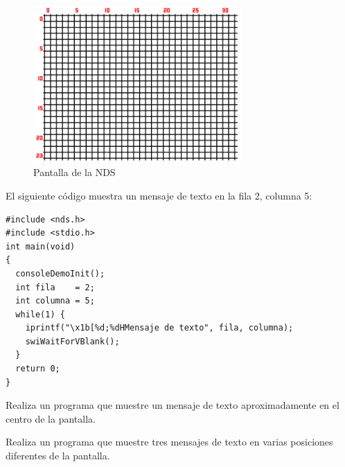 \begin{figure}[t]
\centering
\includegraphics[height=6cm]{Figuras/C3/c3_eclipse12.png}
\caption{Pantalla de la NDS}
\label{fig_c3_texto}
\end{figure}

\begin{example}
El siguiente código muestra un mensaje de texto en la fila 2, columna 5:
\begin{lstlisting}
#include <nds.h>
#include <stdio.h>
int main(void)
{
  consoleDemoInit(); 
  int fila    = 2;
  int columna = 5;
  while(1) {
  	iprintf("\x1b[%d;%dHMensaje de texto", fila, columna);
  	swiWaitForVBlank();  
  }
  return 0;
}
\end{lstlisting}
\end{example}

\begin{exercise}
Realiza un programa que muestre un mensaje de texto aproximadamente en el centro de la pantalla. 
\end{exercise}

\begin{exercise}
Realiza un programa que muestre tres mensajes de texto en varias posiciones diferentes de la pantalla. 
\end{exercise}

